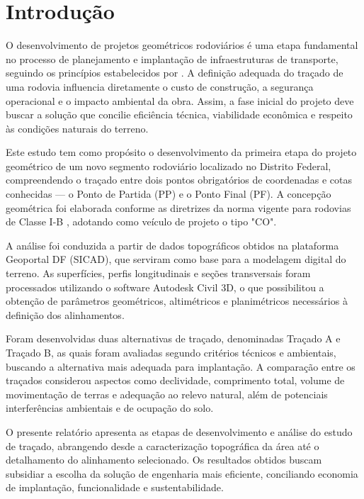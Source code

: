 \chapter{Introdução}
\label{cap:introducao}

O desenvolvimento de projetos geométricos rodoviários é uma etapa fundamental no processo de planejamento e implantação de infraestruturas de transporte, seguindo os princípios estabelecidos por \cite{lee2003}. A definição adequada do traçado de uma rodovia influencia diretamente o custo de construção, a segurança operacional e o impacto ambiental da obra. Assim, a fase inicial do projeto deve buscar a solução que concilie eficiência técnica, viabilidade econômica e respeito às condições naturais do terreno.

Este estudo tem como propósito o desenvolvimento da primeira etapa do projeto geométrico de um novo segmento rodoviário localizado no Distrito Federal, compreendendo o traçado entre dois pontos obrigatórios de coordenadas e cotas conhecidas — o Ponto de Partida (PP) e o Ponto Final (PF). A concepção geométrica foi elaborada conforme as diretrizes da norma vigente para rodovias de Classe I-B \cite{dner1999}, adotando como veículo de projeto o tipo "CO".


A análise foi conduzida a partir de dados topográficos obtidos na plataforma Geoportal DF (SICAD), que serviram como base para a modelagem digital do terreno. As superfícies, perfis longitudinais e seções transversais foram processados utilizando o software Autodesk Civil 3D, o que possibilitou a obtenção de parâmetros geométricos, altimétricos e planimétricos necessários à definição dos alinhamentos.

Foram desenvolvidas duas alternativas de traçado, denominadas Traçado A e Traçado B, as quais foram avaliadas segundo critérios técnicos e ambientais, buscando a alternativa mais adequada para implantação. A comparação entre os traçados considerou aspectos como declividade, comprimento total, volume de movimentação de terras e adequação ao relevo natural, além de potenciais interferências ambientais e de ocupação do solo.

O presente relatório apresenta as etapas de desenvolvimento e análise do estudo de traçado, abrangendo desde a caracterização topográfica da área até o detalhamento do alinhamento selecionado. Os resultados obtidos buscam subsidiar a escolha da solução de engenharia mais eficiente, conciliando economia de implantação, funcionalidade e sustentabilidade.

